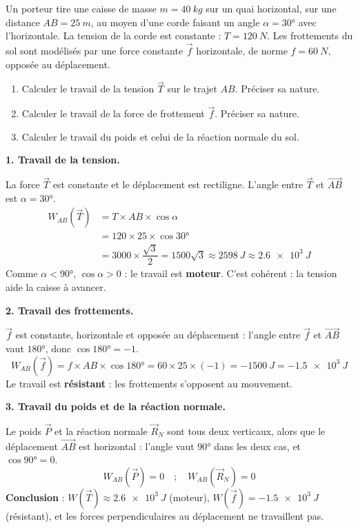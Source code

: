 \documentclass[11pt]{article}
\begin{document}
\begin{exoresolu}
Un porteur tire une caisse de masse $m = \SI{40}{kg}$ sur un quai horizontal, sur une distance $AB = \SI{25}{m}$, au moyen d'une corde faisant un angle $\alpha = 30°$ avec l'horizontale. La tension de la corde est constante : $T = \SI{120}{N}$. Les frottements du sol sont modélisés par une force constante $\vec{f}$ horizontale, de norme $f = \SI{60}{N}$, opposée au déplacement.
\begin{enumerate}
\item Calculer le travail de la tension $\vec{T}$ sur le trajet $AB$. Préciser sa nature.
\item Calculer le travail de la force de frottement $\vec{f}$. Préciser sa nature.
\item Calculer le travail du poids et celui de la réaction normale du sol.
\end{enumerate}
\tcblower
\textbf{1. Travail de la tension.}

La force $\vec{T}$ est constante et le déplacement est rectiligne. L'angle entre $\vec{T}$ et $\overrightarrow{AB}$ est $\alpha = 30°$.
\begin{align*}
W_{AB}(\vec{T}) &= T \times AB \times \cos\alpha \\
&= 120 \times 25 \times \cos 30° \\
&= 3000 \times \dfrac{\sqrt{3}}{2} = 1500\sqrt{3} \approx \SI{2598}{J} \approx \SI{2.6e3}{J}
\end{align*}
Comme $\alpha < 90°$, $\cos\alpha > 0$ : le travail est \textbf{moteur}. C'est cohérent : la tension aide la caisse à avancer.

\textbf{2. Travail des frottements.}

$\vec{f}$ est constante, horizontale et opposée au déplacement : l'angle entre $\vec{f}$ et $\overrightarrow{AB}$ vaut $180°$, donc $\cos 180° = -1$.
\[ W_{AB}(\vec{f}) = f \times AB \times \cos 180° = 60 \times 25 \times (-1) = \SI{-1500}{J} = \SI{-1.5e3}{J} \]
Le travail est \textbf{résistant} : les frottements s'opposent au mouvement.

\textbf{3. Travail du poids et de la réaction normale.}

Le poids $\vec{P}$ et la réaction normale $\vec{R}_N$ sont tous deux verticaux, alors que le déplacement $\overrightarrow{AB}$ est horizontal : l'angle vaut $90°$ dans les deux cas, et $\cos 90° = 0$.
\[ W_{AB}(\vec{P}) = 0 \quad ; \quad W_{AB}(\vec{R}_N) = 0 \]
\textbf{Conclusion} : $W(\vec{T}) \approx \SI{2.6e3}{J}$ (moteur), $W(\vec{f}) = \SI{-1.5e3}{J}$ (résistant), et les forces perpendiculaires au déplacement ne travaillent pas.
\end{exoresolu}
\end{document}
